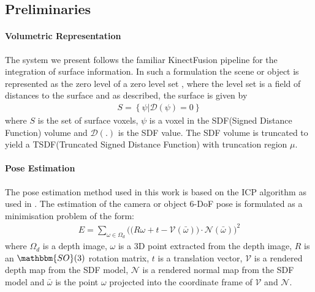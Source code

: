 \subsection{Preliminaries}
\paragraph{Volumetric Representation}
The system we present follows the familiar KinectFusion \cite{Newcombe2011} pipeline for the integration of surface information. In such a 
formulation the scene or object is represented as the zero level of a zero level set \cite{Curless1996}, where the level set is a field of distances 
to the surface and as described, the surface is given by
\begin{equation}
\begin{split}
S = \left\{\psi | \mathcal{D}(\psi) = 0\right\}
\end{split}
\end{equation}
where $S$ is the set of surface voxels, $\psi$ is a voxel in the SDF(Signed Distance Function) volume and $\mathcal{D}(.)$ is the SDF value. 
The SDF volume is truncated to yield a TSDF(Truncated Signed Distance Function) with truncation region $\mu$.

\paragraph{Pose Estimation}
The pose estimation method used in this work is based on the ICP algorithm as used in \cite{Newcombe2011, Prisacariu2014}. The estimation of 
the camera or object 6-DoF pose is formulated as a minimisation problem of the form:
\begin{equation}
\begin{split}
E = \sum_{\omega \in \Omega_{d}} \bigg( \big( R\omega + t - \mathcal{V}(\bar{\omega}) \big) \cdot \mathcal{N}(\bar{\omega}) \bigg)^{2}
\end{split}
\end{equation}
where $\Omega_{d}$ is a depth image, $\omega$ is a 3D point extracted from the depth image, $R$ is an  $\mathbbm{SO}(3)$ 
rotation matrix, $t$ is a translation vector, $\mathcal{V}$ is a rendered depth map from the SDF model, $\mathcal{N}$ is a rendered 
normal map from the SDF model and $\bar{\omega}$ is the point $\omega$ projected into the coordinate frame of $\mathcal{V}$ and 
$\mathcal{N}$.

